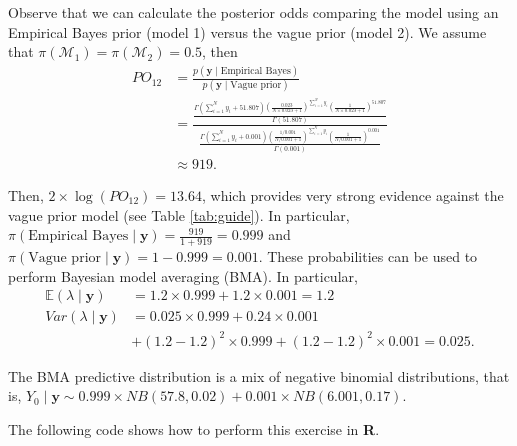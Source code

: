 Observe that we can calculate the posterior odds comparing the model using an Empirical Bayes prior (model 1) versus the vague prior (model 2). We assume that $\pi(\mathcal{M}_1) = \pi(\mathcal{M}_2) = 0.5$, then
\begin{align*}
	PO_{12}&=\frac{p(\mathbf{y}\mid \text{Empirical Bayes})}{p(\mathbf{y}\mid \text{Vague prior})}\\
	&=\frac{\frac{\Gamma(\sum_{i=1}^N y_i+51.807)\left(\frac{0.023}{N\times 0.023+1}\right)^{\sum_{i=1}^N y_i}\left(\frac{1}{N\times 0.023+1}\right)^{51.807}}{\Gamma(51.807)}}{\frac{\Gamma(\sum_{i=1}^N y_i+0.001)\left(\frac{1/0.001}{N/0.001+1}\right)^{\sum_{i=1}^N y_i}\left(\frac{1}{N/0.001+1}\right)^{0.001}}{\Gamma(0.001)}}\\
	&\approx 919.
\end{align*}

Then, $2 \times \log(PO_{12}) = 13.64$, which provides very strong evidence against the vague prior model (see Table \ref{tab:guide}). In particular, $\pi(\text{Empirical Bayes} \mid \mathbf{y}) = \frac{919}{1 + 919} = 0.999$ and $\pi(\text{Vague prior} \mid \mathbf{y}) = 1 - 0.999 = 0.001$. These probabilities can be used to perform Bayesian model averaging (BMA). In particular,
\begin{align*}
	\mathbb{E}(\lambda\mid \mathbf{y})&=1.2\times 0.999+1.2\times 0.001=1.2\\
	Var(\lambda\mid \mathbf{y})&=0.025\times 0.999+0.24\times 0.001\\
	& + (1.2-1.2)^2\times 0.999 + (1.2-1.2)^2\times 0.001= 0.025.
\end{align*}

The BMA predictive distribution is a mix of negative binomial distributions, that is, $Y_0\mid \mathbf{y}\sim 0.999\times NB(57.8, 0.02)+0.001\times NB(6.001, 0.17)$.

The following code shows how to perform this exercise in \textbf{R}.

